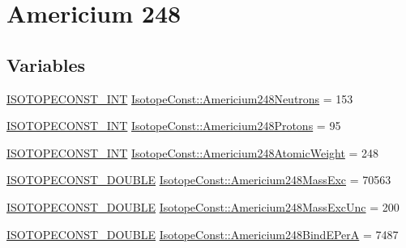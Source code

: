 \hypertarget{group___isotope_const-_americium-_am248}{}\section{Americium 248}
\label{group___isotope_const-_americium-_am248}
\subsection*{Variables}
\begin{DoxyCompactItemize}
\item 
\mbox{\hyperlink{group___isotope_const-_macros_ga5f18360b3e99483a35c32d789e62621c}{I\+S\+O\+T\+O\+P\+E\+C\+O\+N\+S\+T\+\_\+\+I\+NT}} \mbox{\hyperlink{group___isotope_const-_americium-_am248_gaa3a76013a86e39233ed9c74f9b20fe17}{Isotope\+Const\+::\+Americium248\+Neutrons}} = 153
\item 
\mbox{\hyperlink{group___isotope_const-_macros_ga5f18360b3e99483a35c32d789e62621c}{I\+S\+O\+T\+O\+P\+E\+C\+O\+N\+S\+T\+\_\+\+I\+NT}} \mbox{\hyperlink{group___isotope_const-_americium-_am248_ga6032f41a767134c48276c5d2569e58e8}{Isotope\+Const\+::\+Americium248\+Protons}} = 95
\item 
\mbox{\hyperlink{group___isotope_const-_macros_ga5f18360b3e99483a35c32d789e62621c}{I\+S\+O\+T\+O\+P\+E\+C\+O\+N\+S\+T\+\_\+\+I\+NT}} \mbox{\hyperlink{group___isotope_const-_americium-_am248_ga8e96b48456df41e8ab94bbe695a8761f}{Isotope\+Const\+::\+Americium248\+Atomic\+Weight}} = 248
\item 
\mbox{\hyperlink{group___isotope_const-_macros_ga8f45a7272ce02c0b4c65c44636ed719a}{I\+S\+O\+T\+O\+P\+E\+C\+O\+N\+S\+T\+\_\+\+D\+O\+U\+B\+LE}} \mbox{\hyperlink{group___isotope_const-_americium-_am248_gab39ea355580113ba70c473df72f3eabf}{Isotope\+Const\+::\+Americium248\+Mass\+Exc}} = 70563
\item 
\mbox{\hyperlink{group___isotope_const-_macros_ga8f45a7272ce02c0b4c65c44636ed719a}{I\+S\+O\+T\+O\+P\+E\+C\+O\+N\+S\+T\+\_\+\+D\+O\+U\+B\+LE}} \mbox{\hyperlink{group___isotope_const-_americium-_am248_ga5d1babd6ba9f3f090e32614fcf7bb794}{Isotope\+Const\+::\+Americium248\+Mass\+Exc\+Unc}} = 200
\item 
\mbox{\hyperlink{group___isotope_const-_macros_ga8f45a7272ce02c0b4c65c44636ed719a}{I\+S\+O\+T\+O\+P\+E\+C\+O\+N\+S\+T\+\_\+\+D\+O\+U\+B\+LE}} \mbox{\hyperlink{group___isotope_const-_americium-_am248_ga220dd08f633dfaa9faec7c7703c679b7}{Isotope\+Const\+::\+Americium248\+Bind\+E\+PerA}} = 7487
\item 

\end{DoxyCompactItemize}
